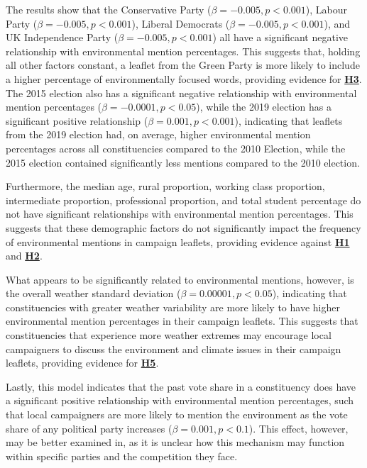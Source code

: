 \documentclass[preprint,12pt,authoryear]{elsarticle}
\begin{document}
The results show that the Conservative Party (\(\beta = -0.005, p < 0.001\)), Labour Party (\(\beta = -0.005, p < 0.001\)), Liberal Democrats (\(\beta = -0.005, p < 0.001\)), and UK Independence Party (\(\beta = -0.005, p < 0.001\)) all have a significant negative relationship with environmental mention percentages. This suggests that, holding all other factors constant, a leaflet from the Green Party is more likely to include a higher percentage of environmentally focused words, providing evidence for \textbf{\hyperlink{H3}{H3}}. The 2015 election also has a significant negative relationship with environmental mention percentages (\(\beta = -0.0001, p < 0.05\)), while the 2019 election has a significant positive relationship (\(\beta = 0.001, p < 0.001\)), indicating that leaflets from the 2019 election had, on average, higher environmental mention percentages across all constituencies compared to the 2010 Election, while the 2015 election contained significantly less mentions compared to the 2010 election.

Furthermore, the median age, rural proportion, working class proportion, intermediate proportion, professional proportion, and total student percentage do not have significant relationships with environmental mention percentages. This suggests that these demographic factors do not significantly impact the frequency of environmental mentions in campaign leaflets, providing evidence against \textbf{\hyperlink{H1}{H1}} and \textbf{\hyperlink{H2}{H2}}.

What appears to be significantly related to environmental mentions, however, is the overall weather standard deviation (\(\beta = 0.00001, p < 0.05\)), indicating that constituencies with greater weather variability are more likely to have higher environmental mention percentages in their campaign leaflets. This suggests that constituencies that experience more weather extremes may encourage local campaigners to discuss the environment and climate issues in their campaign leaflets, providing evidence for \textbf{\hyperlink{H5}{H5}}.

Lastly, this model indicates that the past vote share in a constituency does have a significant positive relationship with environmental mention percentages, such that local campaigners are more likely to mention the environment as the vote share of any political party increases (\(\beta = 0.001, p < 0.1\)). This effect, however, may be better examined in, as it is unclear how this mechanism may function within specific parties and the competition they face.
\end{document}
